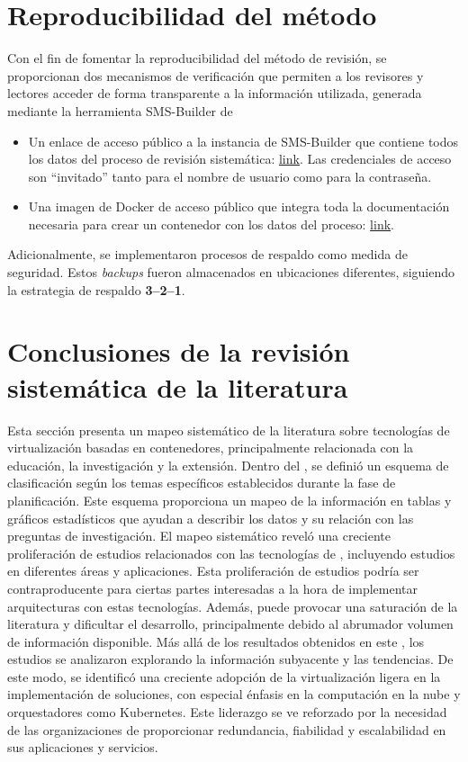 \section{Reproducibilidad del método}
\noindent
Con el fin de fomentar la reproducibilidad del método de revisión, se proporcionan dos mecanismos de verificación que permiten a los revisores y lectores acceder de forma transparente a la información utilizada, generada mediante la herramienta SMS-Builder de~\cite{SMSBuilder2020}
\begin{itemize}
  \item Un enlace de acceso público a la instancia de SMS-Builder que contiene todos los datos del proceso de revisión sistemática: \href{https://sms-vbc.iti.grid.uniquindio.edu.co/sms.xhtml}{link}. Las credenciales de acceso son ``invitado'' tanto para el nombre de usuario como para la contraseña.
  \item Una imagen de Docker de acceso público que integra toda la documentación necesaria para crear un contenedor con los datos del proceso: \href{https://hub.docker.com/r/anubis1001/tg-vbc-sms-builder}{link}.
\end{itemize}

\noindent
Adicionalmente, se implementaron procesos de respaldo como medida de seguridad. Estos \textit{backups} fueron almacenados en ubicaciones diferentes, siguiendo la estrategia de respaldo \textbf{3--2--1}.

\section{Conclusiones de la revisión sistemática de la literatura}
\noindent
Esta sección presenta un mapeo sistemático de la literatura sobre tecnologías de virtualización basadas en contenedores, principalmente relacionada con la educación, la investigación y la extensión. Dentro del \SMS, se definió un esquema de clasificación según los temas específicos establecidos durante la fase de planificación. Este esquema proporciona un mapeo de la información en tablas y gráficos estadísticos que ayudan a describir los datos y su relación con las preguntas de investigación. El mapeo sistemático reveló una creciente proliferación de estudios relacionados con las tecnologías de \VBC, incluyendo estudios en diferentes áreas y aplicaciones. Esta proliferación de estudios podría ser contraproducente para ciertas partes interesadas a la hora de implementar arquitecturas con estas tecnologías. Además, puede provocar una saturación de la literatura y dificultar el desarrollo, principalmente debido al abrumador volumen de información disponible. Más allá de los resultados obtenidos en este \SMS, los estudios se analizaron explorando la información subyacente y las tendencias. De este modo, se identificó una creciente adopción de la virtualización ligera en la implementación de soluciones, con especial énfasis en la computación en la nube y orquestadores como Kubernetes. Este liderazgo se ve reforzado por la necesidad de las organizaciones de proporcionar redundancia, fiabilidad y escalabilidad en sus aplicaciones y servicios.